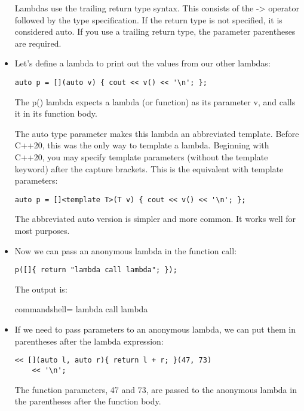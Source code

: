 \begin{itemize}
Lambdas use the trailing return type syntax. This consists of the -> operator followed by the type specification. If the return type is not specified, it is considered auto. If you use a trailing return type, the parameter parentheses are required.

\item 
Let's define a lambda to print out the values from our other lambdas:

\begin{lstlisting}[style=styleCXX]
auto p = [](auto v) { cout << v() << '\n'; };
\end{lstlisting}

The p() lambda expects a lambda (or function) as its parameter v, and calls it in its function body.

The auto type parameter makes this lambda an abbreviated template. Before C++20, this was the only way to template a lambda. Beginning with C++20, you may specify template parameters (without the template keyword) after the capture brackets. This is the equivalent with template parameters:

\begin{lstlisting}[style=styleCXX]
auto p = []<template T>(T v) { cout << v() << '\n'; };
\end{lstlisting}

The abbreviated auto version is simpler and more common. It works well for most purposes.

\item 
Now we can pass an anonymous lambda in the function call:

\begin{lstlisting}[style=styleCXX]
p([]{ return "lambda call lambda"; });
\end{lstlisting}

The output is:

\begin{tcblisting}{commandshell={}}
lambda call lambda
\end{tcblisting}

\item 
If we need to pass parameters to an anonymous lambda, we can put them in parentheses after the lambda expression:

\begin{lstlisting}[style=styleCXX]
<< [](auto l, auto r){ return l + r; }(47, 73)
	<< '\n';
\end{lstlisting}

The function parameters, 47 and 73, are passed to the anonymous lambda in the parentheses after the function body.


\end{itemize}
